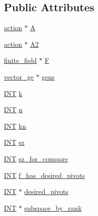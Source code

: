 \subsection*{Public Attributes}
\begin{DoxyCompactItemize}
\item 
\mbox{\hyperlink{classaction}{action}} $\ast$ \mbox{\hyperlink{classorbit__of__subspaces_a3bf084786c3b0b4e9eed34fc544c5243}{A}}
\item 
\mbox{\hyperlink{classaction}{action}} $\ast$ \mbox{\hyperlink{classorbit__of__subspaces_adf280d8721decfe9648ac721d00aae19}{A2}}
\item 
\mbox{\hyperlink{classfinite__field}{finite\+\_\+field}} $\ast$ \mbox{\hyperlink{classorbit__of__subspaces_ac651d12b391463e6cc975ac96fd13f3c}{F}}
\item 
\mbox{\hyperlink{classvector__ge}{vector\+\_\+ge}} $\ast$ \mbox{\hyperlink{classorbit__of__subspaces_a09196ea464155c8e295da66ca2dc68f2}{gens}}
\item 
\mbox{\hyperlink{galois_8h_a09fddde158a3a20bd2dcadb609de11dc}{I\+NT}} \mbox{\hyperlink{classorbit__of__subspaces_a751bf357ad6cb1e93a2d76ff271fcfa4}{k}}
\item 
\mbox{\hyperlink{galois_8h_a09fddde158a3a20bd2dcadb609de11dc}{I\+NT}} \mbox{\hyperlink{classorbit__of__subspaces_a86783a798a9d837bfa689eef4e6554f5}{n}}
\item 
\mbox{\hyperlink{galois_8h_a09fddde158a3a20bd2dcadb609de11dc}{I\+NT}} \mbox{\hyperlink{classorbit__of__subspaces_ad01cad41deaac840ab7de27daeb59812}{kn}}
\item 
\mbox{\hyperlink{galois_8h_a09fddde158a3a20bd2dcadb609de11dc}{I\+NT}} \mbox{\hyperlink{classorbit__of__subspaces_ab733c7086457fc40f74a08f4e8a0ab6e}{sz}}
\item 
\mbox{\hyperlink{galois_8h_a09fddde158a3a20bd2dcadb609de11dc}{I\+NT}} \mbox{\hyperlink{classorbit__of__subspaces_af65128b411ed794d71d19153bb89f88d}{sz\+\_\+for\+\_\+compare}}
\item 
\mbox{\hyperlink{galois_8h_a09fddde158a3a20bd2dcadb609de11dc}{I\+NT}} \mbox{\hyperlink{classorbit__of__subspaces_a9c95162fa0368278397b0c663e4d3900}{f\+\_\+has\+\_\+desired\+\_\+pivots}}
\item 
\mbox{\hyperlink{galois_8h_a09fddde158a3a20bd2dcadb609de11dc}{I\+NT}} $\ast$ \mbox{\hyperlink{classorbit__of__subspaces_af4bb41c15c2773bf89e5c95b6526ed8f}{desired\+\_\+pivots}}
\item 
\mbox{\hyperlink{galois_8h_a09fddde158a3a20bd2dcadb609de11dc}{I\+NT}} $\ast$ \mbox{\hyperlink{classorbit__of__subspaces_a60fa89131497be64964a6f8dc45be329}{subspace\+\_\+by\+\_\+rank}}

\end{DoxyCompactItemize}
